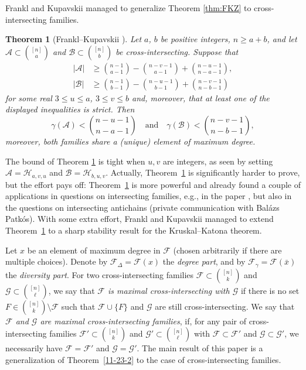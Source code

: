 \documentclass[11pt]{article}
\newcommand{\m}{\mathcal}
\newtheorem{theorem}{Theorem}[section]
\begin{document}
Frankl and Kupavskii \cite{FK2021jcta} managed to generalize Theorem \ref{thm:FKZ} to cross-intersecting families.

\begin{theorem}[Frankl--Kupavskii \cite{FK2021jcta}] 
\label{thm:FK}
Let \( a \), \( b \) be positive integers, \( n \geq a + b \), and let \( \mathcal{A} \subset \binom{[n]}{a} \) and \( \mathcal{B} \subset \binom{[n]}{b} \) be cross-intersecting. Suppose that
\begin{align*}
|\mathcal{A}| & \geq \binom{n-1}{a-1} - \binom{n-v-1}{a-1} + \binom{n-u-1}{n-a-1}, \\
|\mathcal{B}| &\geq \binom{n-1}{b-1} - \binom{n-u-1}{b-1} + \binom{n-v-1}{n-b-1}
\end{align*}
for some real \( 3 \leq u \leq a \), \( 3 \leq v \leq b \) and, moreover, that at least one of the displayed inequalities is strict. Then
\[
\gamma(\mathcal{A}) < \binom{n-u-1}{n-a-1} \quad \text{and} \quad \gamma(\mathcal{B}) < \binom{n-v-1}{n-b-1},
\]
moreover, both families share a (unique) element of maximum degree.
\end{theorem}

The bound of Theorem \ref{thm:FK} is tight when $u,v$ are integers, as seen 
 by setting $\m A = \m H_{a,v,u}$ and $ \m B = \m H_{b,u,v}$. Actually, Theorem~\ref{thm:FK} is significantly harder to prove, but the effort pays off: Theorem~\ref{thm:FK} is more powerful and already found a couple of applications in questions on intersecting families, e.g., in the paper \cite{FK2020}, but also in the questions on intersecting antichains (private communication with Bal\'azs Patk\'os). With some extra effort, Frankl and Kupavskii \cite{FK2021jcta} managed to extend Theorem~\ref{thm:FK} to a sharp stability result for the Kruskal--Katona theorem.



Let $x$ be an element of maximum degree in $\mathcal{F}$ (chosen arbitrarily if there are multiple choices). Denote by $\mathcal{F}_\Delta = \mathcal{F}(x)$ the {\it degree part}, and by $\mathcal{F}_\gamma = \mathcal{F}(\bar x)$ the {\it diversity part}.   
For two cross-intersecting families $\m F\subset {[n]\choose k}$ and $\m G \subset {[n]\choose \ell}$, we say that {\it $\m F$ is  maximal cross-intersecting with $\m G$} if there is no set $F\in {[n]\choose k}\setminus \m F$ such that $\m F \cup \{F\}$ and $\m G$ are still cross-intersecting.
We say that 
{\it $\m F$ and $\m G$ are maximal cross-intersecting families}, if, for any pair of cross-intersecting families $\m F'\subset {[n]\choose k}$ and $\m G'\subset {[n]\choose \ell}$ with $\m F\subset \m F'$ and $\m G\subset \m G'$, we necessarily have $\m F= \m F'$ and $\m G= \m G'$.
The main result of this paper is a generalization of Theorem~\ref{11-23-2} to the case of cross-intersecting families.
\end{document}
